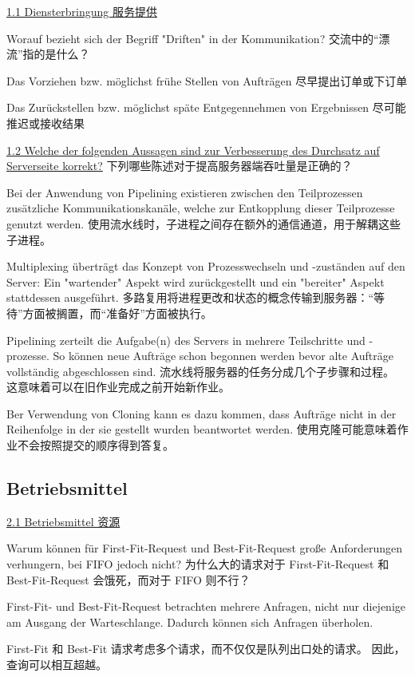 \documentclass[fleqn]{article}
\begin{document}
\noindent\uline{1.1	Diensterbringung 服务提供}

\noindent Worauf bezieht sich der Begriff "Driften" in der Kommunikation?
交流中的“漂流”指的是什么？

Das Vorziehen bzw. möglichst frühe Stellen von Aufträgen
尽早提出订单或下订单

Das Zurückstellen bzw. möglichst späte Entgegennehmen von Ergebnissen
尽可能推迟或接收结果

\noindent\uline{1.2 Welche der folgenden Aussagen sind zur Verbesserung des Durchsatz auf Serverseite korrekt?}
下列哪些陈述对于提高服务器端吞吐量是正确的？

Bei der Anwendung von Pipelining existieren zwischen den Teilprozessen zusätzliche Kommunikationskanäle, welche zur Entkopplung dieser Teilprozesse genutzt werden.
使用流水线时，子进程之间存在额外的通信通道，用于解耦这些子进程。

Multiplexing überträgt das Konzept von Prozesswechseln und -zuständen auf den Server: Ein "wartender" Aspekt wird zurückgestellt und ein "bereiter" Aspekt stattdessen ausgeführt.
多路复用将进程更改和状态的概念传输到服务器：“等待”方面被搁置，而“准备好”方面被执行。

Pipelining zerteilt die Aufgabe(n) des Servers in mehrere Teilschritte und -prozesse. So können neue Aufträge schon begonnen werden bevor alte Aufträge vollständig abgeschlossen sind.
流水线将服务器的任务分成几个子步骤和过程。 这意味着可以在旧作业完成之前开始新作业。

Ber Verwendung von Cloning kann es dazu kommen, dass Aufträge nicht in der Reihenfolge in der sie gestellt wurden beantwortet werden.
使用克隆可能意味着作业不会按照提交的顺序得到答复。


\subsection{Betriebsmittel}

\noindent\uline{2.1 Betriebsmittel 资源}

\noindent Warum können für First-Fit-Request und Best-Fit-Request große Anforderungen verhungern, bei FIFO jedoch nicht?
为什么大的请求对于 First-Fit-Request 和 Best-Fit-Request 会饿死，而对于 FIFO 则不行？

First-Fit- und Best-Fit-Request betrachten mehrere Anfragen, nicht nur diejenige am Ausgang der Warteschlange. Dadurch können sich Anfragen überholen.

First-Fit 和 Best-Fit 请求考虑多个请求，而不仅仅是队列出口处的请求。 因此，查询可以相互超越。
\end{document}

